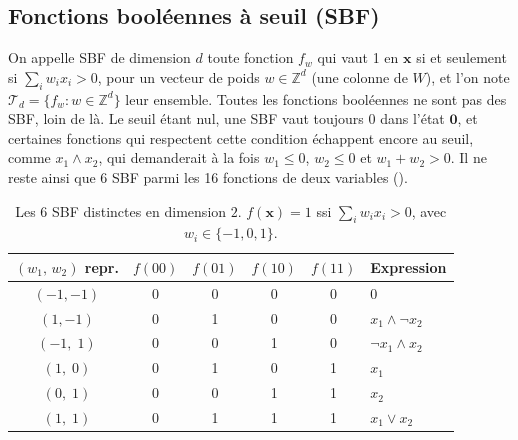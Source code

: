 \documentclass[12pt, a4paper]{article}
\begin{document}
\subsection{Fonctions booléennes à seuil (SBF)}
\label{sec:sbf}

On appelle SBF de dimension $d$ toute fonction $f_w$ qui vaut 1 en $\mathbf{x}$ si et seulement si $\sum_i w_i x_i > 0$, pour un vecteur de poids $w \in \mathbb{Z}^d$ (une colonne de $W$), et l'on note $\mathcal{T}_d = \{ f_w : w \in \mathbb{Z}^d \}$ leur ensemble.
Toutes les fonctions booléennes ne sont pas des SBF, loin de là.
Le seuil étant nul, une SBF vaut toujours 0 dans l'état $\mathbf{0}$, et certaines fonctions qui respectent cette condition échappent encore au seuil, comme $x_1 \wedge x_2$, qui demanderait à la fois $w_1 \le 0$, $w_2 \le 0$ et $w_1 + w_2 > 0$.
Il ne reste ainsi que 6 SBF parmi les 16 fonctions de deux variables ().

\begin{table}[H]
\centering
\caption{Les 6 SBF distinctes en dimension $2$. $f(\mathbf{x}) = 1$ ssi $\sum_i w_i x_i > 0$, avec $w_i \in \{-1, 0, 1\}$.}
\label{tab:sbf2}
\begin{tabular}{cccccl}
\toprule
$(w_1,\,w_2)$ repr. & $f(00)$ & $f(01)$ & $f(10)$ & $f(11)$ & Expression \\
\midrule
$(-1,-1)$ & 0 & 0 & 0 & 0 & $0$ \\
$(1,-1)$  & 0 & 1 & 0 & 0 & $x_1 \wedge \neg x_2$ \\
$(-1,\;1)$  & 0 & 0 & 1 & 0 & $\neg x_1 \wedge x_2$ \\
$(1,\;0)$   & 0 & 1 & 0 & 1 & $x_1$ \\
$(0,\;1)$   & 0 & 0 & 1 & 1 & $x_2$ \\
$(1,\;1)$   & 0 & 1 & 1 & 1 & $x_1 \vee x_2$ \\
\bottomrule
\end{tabular}
\end{table}
\end{document}
